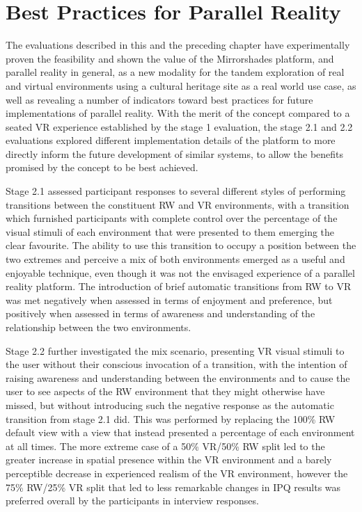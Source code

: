 \section{Best Practices for Parallel Reality}
\label{best-practices-for-parallel-reality}
The evaluations described in this and the preceding chapter have experimentally proven the feasibility and shown the value of the Mirrorshades platform, and parallel reality in general, as a new modality for the tandem exploration of real and virtual environments using a cultural heritage site as a real world use case, as well as revealing a number of indicators toward best practices for future implementations of parallel reality. With the merit of the concept compared to a seated VR experience established by the stage 1 evaluation, the stage 2.1 and 2.2 evaluations explored different implementation details of the platform to more directly inform the future development of similar systems, to allow the benefits promised by the concept to be best achieved.

Stage 2.1 assessed participant responses to several different styles of performing transitions between the constituent RW and VR environments, with a transition which furnished participants with complete control over the percentage of the visual stimuli of each environment that were presented to them emerging the clear favourite. The ability to use this transition to occupy a position between the two extremes and perceive a mix of both environments emerged as a useful and enjoyable technique, even though it was not the envisaged experience of a parallel reality platform. The introduction of brief automatic transitions from RW to VR was met negatively when assessed in terms of enjoyment and preference, but positively when assessed in terms of awareness and understanding of the relationship between the two environments.

Stage 2.2 further investigated the mix scenario, presenting VR visual stimuli to the user without their conscious invocation of a transition, with the intention of raising awareness and understanding between the environments and to cause the user to see aspects of the RW environment that they might otherwise have missed, but without introducing such the negative response as the automatic transition from stage 2.1 did. This was performed by replacing the 100\% RW default view with a view that instead presented a percentage of each environment at all times. The more extreme case of a 50\% VR/50\% RW split led to the greater increase in spatial presence within the VR environment and a barely perceptible decrease in experienced realism of the VR environment, however the 75\% RW/25\% VR split that led to less remarkable changes in IPQ results was preferred overall by the participants in interview responses.

